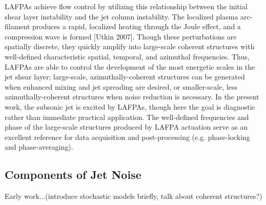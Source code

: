 LAFPAs achieve flow control by utilizing this relationship between the initial shear layer instability and the jet column instability.
The localized plasma arc-filament produces a rapid, localized heating through the Joule effect, and a compression wave is formed [Utkin 2007].
Though these perturbations are spatially discrete, they quickly amplify into large-scale coherent structures with well-defined characteristic spatial, temporal, and azimuthal frequencies.
Thus, LAFPAs are able to control the development of the most energetic scales in the jet shear layer; large-scale, azimuthally-coherent structures can be generated when enhanced mixing and jet spreading are desired, or smaller-scale, less azimuthally-coherent structures when noise reduction is necessary. 
In the present work, the subsonic jet is excited by LAFPAs, though here the goal is diagnostic rather than immediate practical application.
The well-defined frequencies and phase of the large-scale structures produced by LAFPA actuation serve as an excellent reference for data acquisition and post-processing (e.g. phase-locking and phase-averaging).

\subsection{Components of Jet Noise}
Early work...(introduce stochastic models briefly, talk about coherent structures?)


